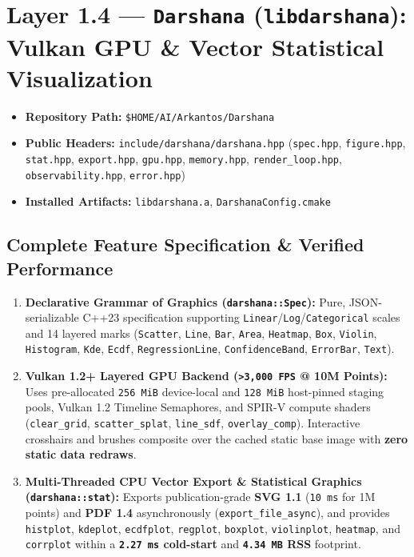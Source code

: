 \documentclass[11pt,a4paper]{article}
\begin{document}
\section{Layer 1.4 --- \texttt{Darshana} (\texttt{libdarshana}): Vulkan GPU \& Vector Statistical Visualization}

\begin{itemize}[leftmargin=1.5em,itemsep=1pt]
  \item \textbf{Repository Path:} \texttt{\$HOME/AI/Arkantos/Darshana}
  \item \textbf{Public Headers:} \texttt{include/darshana/darshana.hpp} (\texttt{spec.hpp}, \texttt{figure.hpp}, \texttt{stat.hpp}, \texttt{export.hpp}, \texttt{gpu.hpp}, \texttt{memory.hpp}, \texttt{render\_loop.hpp}, \texttt{observability.hpp}, \texttt{error.hpp})
  \item \textbf{Installed Artifacts:} \texttt{libdarshana.a}, \texttt{DarshanaConfig.cmake}
\end{itemize}

\subsection{Complete Feature Specification \& Verified Performance}
\begin{enumerate}[leftmargin=1.5em]
  \item \textbf{Declarative Grammar of Graphics (\texttt{darshana::Spec}):} Pure, JSON-serializable C++23 specification supporting \texttt{Linear}/\texttt{Log}/\texttt{Categorical} scales and 14 layered marks (\texttt{Scatter}, \texttt{Line}, \texttt{Bar}, \texttt{Area}, \texttt{Heatmap}, \texttt{Box}, \texttt{Violin}, \texttt{Histogram}, \texttt{Kde}, \texttt{Ecdf}, \texttt{RegressionLine}, \texttt{ConfidenceBand}, \texttt{ErrorBar}, \texttt{Text}).
  \item \textbf{Vulkan 1.2+ Layered GPU Backend (\texttt{>3,000 FPS} @ 10M Points):} Uses pre-allocated \texttt{256 MiB} device-local and \texttt{128 MiB} host-pinned staging pools, Vulkan 1.2 Timeline Semaphores, and SPIR-V compute shaders (\texttt{clear\_grid}, \texttt{scatter\_splat}, \texttt{line\_sdf}, \texttt{overlay\_comp}). Interactive crosshairs and brushes composite over the cached static base image with \textbf{zero static data redraws}.
  \item \textbf{Multi-Threaded CPU Vector Export \& Statistical Graphics (\texttt{darshana::stat}):} Exports publication-grade \textbf{SVG 1.1} (\texttt{10 ms} for 1M points) and \textbf{PDF 1.4} asynchronously (\texttt{export\_file\_async}), and provides \texttt{histplot}, \texttt{kdeplot}, \texttt{ecdfplot}, \texttt{regplot}, \texttt{boxplot}, \texttt{violinplot}, \texttt{heatmap}, and \texttt{corrplot} within a \textbf{\texttt{2.27 ms} cold-start} and \textbf{\texttt{4.34 MB} RSS} footprint.
\end{enumerate}
\end{document}
